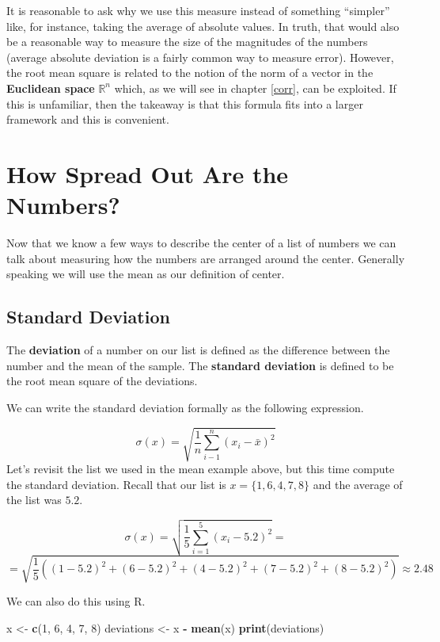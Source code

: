 \documentclass[]{book}
\newenvironment{Shaded}{\begin{snugshade}}{\end{snugshade}}
\newcommand{\DecValTok}[1]{\textcolor[rgb]{0.00,0.00,0.81}{#1}}
\newcommand{\KeywordTok}[1]{\textcolor[rgb]{0.13,0.29,0.53}{\textbf{#1}}}
\newcommand{\NormalTok}[1]{#1}
\newcommand{\OperatorTok}[1]{\textcolor[rgb]{0.81,0.36,0.00}{\textbf{#1}}}
\newcommand{\StringTok}[1]{\textcolor[rgb]{0.31,0.60,0.02}{#1}}
\begin{document}
It is reasonable to ask why we use this measure instead of something ``simpler'' like, for instance, taking the average of absolute values. In truth, that would also be a reasonable way to measure the size of the magnitudes of the numbers (average absolute deviation is a fairly common way to measure error). However, the root mean square is related to the notion of the norm of a vector in the \textbf{Euclidean space} \(\mathbb{R}^n\) which, as we will see in chapter \ref{corr}, can be exploited. If this is unfamiliar, then the takeaway is that this formula fits into a larger framework and this is convenient.

\hypertarget{how-spread-out-are-the-numbers}{%
\section{How Spread Out Are the Numbers?}\label{how-spread-out-are-the-numbers}}

Now that we know a few ways to describe the center of a list of numbers we can talk about measuring how the numbers are arranged around the center. Generally speaking we will use the mean as our definition of center.

\hypertarget{standard-deviation}{%
\subsection{Standard Deviation}\label{standard-deviation}}

The \textbf{deviation} of a number on our list is defined as the difference between the number and the mean of the sample. The \textbf{standard deviation} is defined to be the root mean square of the deviations.

We can write the standard deviation formally as the following expression.

\[\sigma(x) = \sqrt{\frac{1}{n}\sum_{i-1}^n (x_i - \bar{x})^2}\]
Let's revisit the list we used in the mean example above, but this time compute the standard deviation. Recall that our list is \(x = \{1, 6, 4, 7, 8\}\) and the average of the list was \(5.2\).

\[\sigma(x) = \sqrt{\frac{1}{5} \sum_{i=1}^5 (x_i - 5.2)^2} = \]
\[ = \sqrt{ \frac{1}{5} ((1 - 5.2)^2 + (6 - 5.2)^2 + (4 - 5.2)^2 + (7 - 5.2)^2 + (8 - 5.2)^2)} \approx 2.48 \]

We can also do this using R.

\begin{Shaded}
\begin{Highlighting}[]
\NormalTok{x <-}\StringTok{ }\KeywordTok{c}\NormalTok{(}\DecValTok{1}\NormalTok{, }\DecValTok{6}\NormalTok{, }\DecValTok{4}\NormalTok{, }\DecValTok{7}\NormalTok{, }\DecValTok{8}\NormalTok{)}
\NormalTok{deviations <-}\StringTok{ }\NormalTok{x }\OperatorTok{-}\StringTok{ }\KeywordTok{mean}\NormalTok{(x)}
\KeywordTok{print}\NormalTok{(deviations)}
\end{Highlighting}
\end{Shaded}
\end{document}
